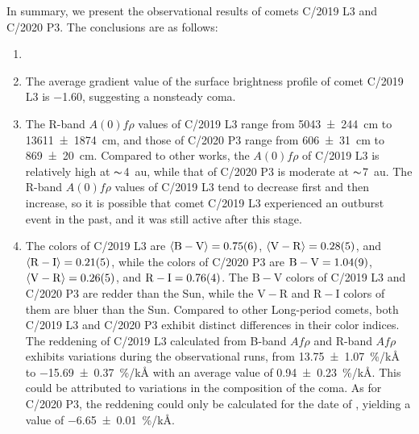 In summary, we present the observational results of comets C/2019 L3 and C/2020 P3. The conclusions are as follows: 
\begin{enumerate}
    \item {} 
    \item The average gradient value of the surface brightness profile of comet C/2019 L3 is \num{-1.60}, suggesting a nonsteady coma. 
    \item The R-band $A(0)f\rho$ values of C/2019 L3 range from {\qty{5043 +- 244}{\cm}} to {\qty{13611 +- 1874}{\cm}}, and those of C/2020 P3 range from {\qty{606 +- 31}{\cm}} to {\qty{869 +- 20}{\cm}}. Compared to other works, the $A(0)f\rho$ of C/2019 L3 is relatively high at $\thicksim${\qty{4}{\astronomicalunit}}, while that of C/2020 P3 is moderate at $\thicksim${\qty{7}{\astronomicalunit}}. The R-band $A(0)f\rho$ values of C/2019 L3 tend to decrease first and then increase, so it is possible that comet C/2019 L3 experienced an outburst event in the past, and it was still active after this stage. 
    \item The colors of C/2019 L3 are  
        $\langle \mathrm{B-V} \rangle = \num{0.75 +- 0.06}$, 
        $\langle \mathrm{V-R} \rangle = \num{0.28 +- 0.05}$, and 
        $\langle \mathrm{R-I} \rangle = \num{0.21 +- 0.05}$,  
        while the colors of C/2020 P3 are 
        $\mathrm{B-V} = \num{1.04 +- 0.09}$, 
        $\langle \mathrm{V-R} \rangle = \num{0.26 +- 0.05}$, and 
        $\mathrm{R-I} = \num{0.76 +- 0.04}$. 
        The $\mathrm{B-V}$ colors of C/2019 L3 and C/2020 P3 are redder than the Sun, while the $\mathrm{V-R}$ and $\mathrm{R-I}$ colors of them are bluer than the Sun. Compared to other Long-period comets, both C/2019 L3 and C/2020 P3 exhibit distinct differences in their color indices. The reddening of C/2019 L3 calculated from B-band $Af\rho$ and R-band $Af\rho$ exhibits variations during the observational runs, from {\qty{13.75 +- 1.07}{\percent/\kilo\angstrom}} to {\qty{-15.69 +- 0.37}{\percent/\kilo\angstrom}} with an average value of {\qty{0.94 +- 0.23}{\percent/\kilo\angstrom}}. This could be attributed to  variations in the composition of the coma. As for C/2020 P3, the reddening could only be calculated for the date of , yielding a value of {\qty{-6.65 +- 0.01}{\percent/\kilo\angstrom}}. 
\end{enumerate}
